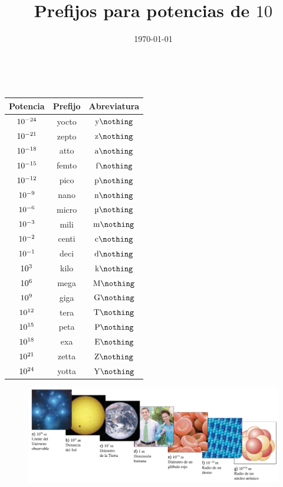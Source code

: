 \documentclass[14pt]{extarticle}
\title{\vspace*{-2cm}Prefijos para potencias de $10$\vspace{-5ex}}
\date{\today}
\begin{document}
\maketitle

\begin{table}[H]
\renewcommand{\arraystretch}{1.1}
\centering\
\begin{tabular}{c | c | c}
Potencia & Prefijo & Abreviatura \\ \hline
$\num{d-24}$ & yocto & $\unit{\yocto\nothing}$ \\ \hline
$\num{d-21}$ & zepto & $\unit{\zepto\nothing}$ \\ \hline
$\num{d-18}$ & atto & $\unit{\atto\nothing}$ \\ \hline
$\num{d-15}$ & femto & $\unit{\femto\nothing}$ \\ \hline
$\num{d-12}$ & pico & $\unit{\pico\nothing}$ \\ \hline
$\num{d-9}$ & nano & $\unit{\nano\nothing}$ \\ \hline
$\num{d-6}$ & micro & $\unit{\micro\nothing}$ \\ \hline
$\num{d-3}$ & mili & $\unit{\milli\nothing}$ \\ \hline
$\num{d-2}$ & centi & $\unit{\centi\nothing}$ \\ \hline
$\num{d-1}$ & deci & $\unit{\deci\nothing}$ \\ \hline
$\num{d3}$ & kilo & $\unit{\kilo\nothing}$ \\ \hline
$\num{d6}$ & mega & $\unit{\mega\nothing}$ \\ \hline
$\num{d9}$ & giga & $\unit{\giga\nothing}$ \\ \hline
$\num{d12}$ & tera & $\unit{\tera\nothing}$ \\ \hline
$\num{d15}$ & peta & $\unit{\peta\nothing}$ \\ \hline
$\num{d18}$ & exa & $\unit{\exa\nothing}$ \\ \hline
$\num{d21}$ & zetta & $\unit{\zetta\nothing}$ \\ \hline
$\num{d24}$ & yotta & $\unit{\yotta\nothing}$ \\ \hline
\end{tabular}
\end{table}
\begin{figure}[H]
    \centering
    \includegraphics[scale=0.65]{Imagenes/Escala_Magnitud.png}
\end{figure}
\end{document}
